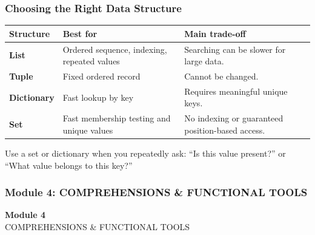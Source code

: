 \documentclass[aspectratio=169,10pt]{beamer}
\newenvironment{bluebox}[1]{%
  \vspace{0.08cm}\begin{tcolorbox}[lecturebox,title={#1},fontupper=\small]%
}{\end{tcolorbox}\vspace{0.05cm}}
\begin{document}
\begin{frame}
\frametitle{Choosing the Right Data Structure}
\small
\renewcommand{\arraystretch}{1.25}
\begin{tabularx}{\linewidth}{>{\bfseries}p{2.4cm}X X}
\toprule
Structure & Best for & Main trade-off \\
\midrule
List & Ordered sequence, indexing, repeated values & Searching can be slower for large data. \\
Tuple & Fixed ordered record & Cannot be changed. \\
Dictionary & Fast lookup by key & Requires meaningful unique keys. \\
Set & Fast membership testing and unique values & No indexing or guaranteed position-based access. \\
\bottomrule
\end{tabularx}
\begin{bluebox}{Performance intuition}
Use a set or dictionary when you repeatedly ask: ``Is this value present?'' or ``What value belongs to this key?''
\end{bluebox}
\end{frame}

\begin{noheadline}
\begin{frame}
\frametitle{Module 4: COMPREHENSIONS \& FUNCTIONAL TOOLS}
\vspace{1.2cm}
\begin{center}
  {\fontsize{30}{36}\selectfont\textbf{Module 4}}\\[0.35cm]
  {\fontsize{22}{28}\selectfont COMPREHENSIONS \& FUNCTIONAL TOOLS}\\[0.7cm]
\end{center}
\end{frame}
\end{noheadline}
\end{document}
